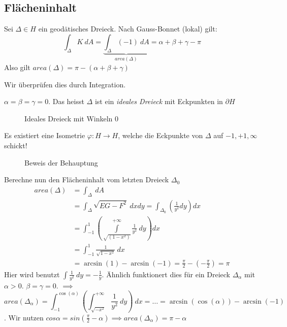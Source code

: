 \documentclass[../main.tex]{subfiles}
\begin{document}
\subsection*{Flächeninhalt}
Sei $\Delta \in H$ ein geodätisches Dreieck. Nach Gauss-Bonnet (lokal) gilt:
$$\int_{\Delta}K \ dA = \underbrace{\int _{\Delta} (-1)\ dA}_{area(\Delta)} = \alpha + \beta + \gamma - \pi$$
Also gilt $area(\Delta)=\pi - (\alpha + \beta + \gamma)$

Wir überprüfen dies durch Integration.
\begin{specialcase}
    $\alpha = \beta = \gamma = 0$. Das heisst $\Delta$ ist ein \emph{ideales Dreieck}
    mit Eckpunkten in $\partial H$
\end{specialcase}
\begin{figure}[htb]
    \centering
    \def\svgwidth{10em}
    
    \caption*{Ideales Dreieck mit Winkeln 0}        
\end{figure}

\begin{claim}
    Es existiert eine Isometrie $\varphi : H \to H$, welche die Eckpunkte von $\Delta$ auf $-1,+1,\infty$ schickt!
\end{claim}
\begin{figure}[htb]
    \centering
    \def\svgwidth{35em}
    
    \caption{Beweis der Behauptung}        
\end{figure}

Berechne nun den Flächeninhalt vom letzten Dreieck $\Delta _0$
\begin{align*}
    area(\Delta)&= \int_{\Delta} \ dA \\
    &= \int _{\Delta}\sqrt{EG-F^2}\ dxdy = \int_{\Delta_0}\left(\frac{1}{y^2}dy \right)dx\\
    &= \int _{-1}^{1}\left( \int \limits_{\sqrt{(1-x^2)}}^{+\infty} \frac{1}{y^2}\ dy\right) dx \\
    &= \int _{-1}^{1} \frac{1}{\sqrt{1-x^2}}\ dx \\
    &= \arcsin(1)-\arcsin(-1) = \frac{\pi}{2}-(-\frac{\pi}{2})=\pi
\end{align*}
Hier wird benutzt $\int \frac{1}{y^2} \ dy = -\frac{1}{y}$.
Ähnlich funktionert dies für ein Dreieck $\Delta _{\alpha}$ mit $\alpha >0$.
$\beta = \gamma = 0$.
$\implies$ $$area(\Delta_\alpha)= \int _{-1}^{\cos(\alpha)}(\int_{\sqrt{-x^2}}^{+\infty}\frac{1}{y^2} \ dy) \ dx = \dots = \arcsin(\cos(\alpha))-\arcsin(-1)$$.
Wir nutzen $cos \alpha = sin(\frac{\pi}{2}-\alpha) \implies area(\Delta _{\alpha})= \pi - \alpha$
\end{document}
